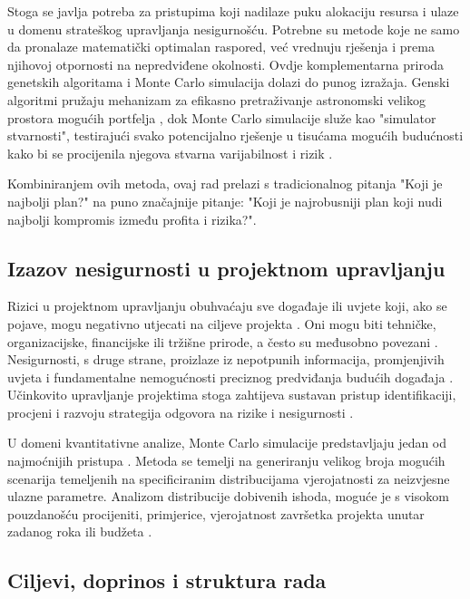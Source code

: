 Stoga se javlja potreba za pristupima koji nadilaze puku alokaciju resursa i ulaze u domenu strateškog upravljanja nesigurnošću. Potrebne su metode koje ne samo da pronalaze matematički optimalan raspored, već vrednuju rješenja i prema njihovoj otpornosti na nepredviđene okolnosti. Ovdje komplementarna priroda genetskih algoritama i Monte Carlo simulacija dolazi do punog izražaja. Genski algoritmi pružaju mehanizam za efikasno pretraživanje astronomski velikog prostora mogućih portfelja \cite{Goldberg1989}, dok Monte Carlo simulacije služe kao "simulator stvarnosti", testirajući svako potencijalno rješenje u tisućama mogućih budućnosti kako bi se procijenila njegova stvarna varijabilnost i rizik \cite{Rubinstein2016}.

Kombiniranjem ovih metoda, ovaj rad prelazi s tradicionalnog pitanja "Koji je najbolji plan?" na puno značajnije pitanje: "Koji je najrobusniji plan koji nudi najbolji kompromis između profita i rizika?".

\subsection{Izazov nesigurnosti u projektnom upravljanju}

Rizici u projektnom upravljanju obuhvaćaju sve događaje ili uvjete koji, ako se pojave, mogu negativno utjecati na ciljeve projekta \cite{Hillson2009}. Oni mogu biti tehničke, organizacijske, financijske ili tržišne prirode, a često su međusobno povezani \cite{PMI2021}. Nesigurnosti, s druge strane, proizlaze iz nepotpunih informacija, promjenjivih uvjeta i fundamentalne nemogućnosti preciznog predviđanja budućih događaja \cite{Smith2014}. Učinkovito upravljanje projektima stoga zahtijeva sustavan pristup identifikaciji, procjeni i razvoju strategija odgovora na rizike i nesigurnosti \cite{Hillson2009}.

U domeni kvantitativne analize, Monte Carlo simulacije predstavljaju jedan od najmoćnijih pristupa \cite{Vose2008}. Metoda se temelji na generiranju velikog broja mogućih scenarija temeljenih na specificiranim distribucijama vjerojatnosti za neizvjesne ulazne parametre. Analizom distribucije dobivenih ishoda, moguće je s visokom pouzdanošću procijeniti, primjerice, vjerojatnost završetka projekta unutar zadanog roka ili budžeta \cite{Rubinstein2016}.

\subsection{Ciljevi, doprinos i struktura rada}

